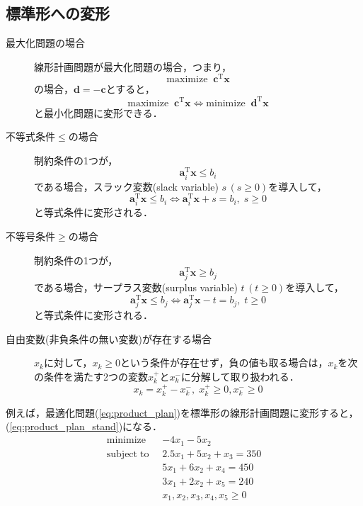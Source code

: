 \documentclass{jsreport}
\begin{document}
\subsection{標準形への変形}
\begin{description}
  \item[最大化問題の場合]
  線形計画問題が最大化問題の場合，つまり，
  \begin{equation}
    \mathrm{maximize} \; \; \bm{c}^{\mathrm{T}}\bm{x} \nonumber
  \end{equation}
  の場合，$\bm{d} = -\bm{c}$とすると，
  \begin{equation}
    \mathrm{maximize} \; \; \bm{c}^{\mathrm{T}}\bm{x} \Leftrightarrow \mathrm{minimize} \; \; \bm{d}^{\mathrm{T}}\bm{x} \nonumber
  \end{equation}
  と最小化問題に変形できる．
  \item[不等式条件$\leq$の場合]
  制約条件の1つが，
  \begin{equation}
    \bm{a}_i^{\mathrm{T}}\bm{x} \leq b_i \nonumber
  \end{equation}
  である場合，スラック変数(slack variable) $s \, (s \geq 0)$を導入して，
  \begin{equation}
    \bm{a}_i^{\mathrm{T}}\bm{x} \leq b_i \Leftrightarrow \bm{a}_i^{\mathrm{T}}\bm{x} + s = b_i, \; s \geq 0 \nonumber
  \end{equation}
  と等式条件に変形される．
  \item[不等号条件$\geq$の場合]
  制約条件の1つが，
  \begin{equation}
    \bm{a}_j^{\mathrm{T}}\bm{x} \geq b_j \nonumber
  \end{equation}
  である場合，サープラス変数(surplus variable) $t \, (t \geq 0)$を導入して，
  \begin{equation}
    \bm{a}_j^{\mathrm{T}}\bm{x} \leq b_j \Leftrightarrow \bm{a}_j^{\mathrm{T}}\bm{x} - t = b_j, \; t \geq 0 \nonumber
  \end{equation}
  と等式条件に変形される．
  \item[自由変数(非負条件の無い変数)が存在する場合]
  $x_k$に対して，$x_k \geq 0$という条件が存在せず，負の値も取る場合は，$x_k$を次の条件を満たす2つの変数$x_k^{+}$と$x_k^{-}$に分解して取り扱われる．
  \begin{equation}
    x_k = x_k^{+} - x_k^{-}, \; x_k^{+} \geq 0, x_k^{-} \geq 0 \nonumber
  \end{equation}
\end{description}

例えば，最適化問題(\ref{eq:product_plan})を標準形の線形計画問題に変形すると，(\ref{eq:product_plan_stand})になる．
\begin{align}\label{eq:product_plan_stand}
  \mathrm{minimize} \; \; &-4x_1 - 5x_2 \nonumber \\
  \mathrm{subject \; to} \; \; &2.5x_1 + 5x_2 + x_3 = 350 \nonumber \\
  &5x_1 + 6x_2 + x_4 = 450 \\
  &3x_1 + 2x_2 + x_5 = 240 \nonumber \\
  &x_1, x_2, x_3, x_4, x_5 \geq 0 \nonumber
\end{align}
\end{document}
